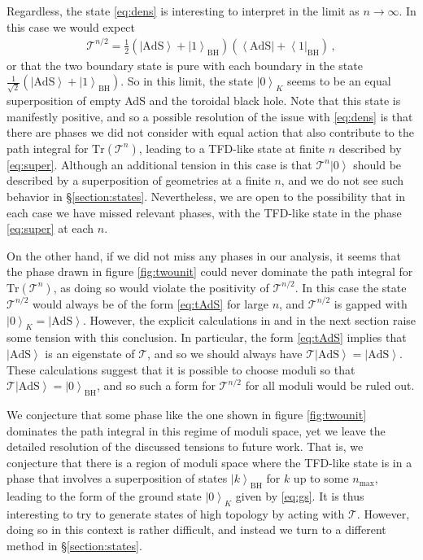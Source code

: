 \documentclass[letterpaper,12pt]{article}
\newcommand{\ban}[1]{\begin{align}#1\end{align}}
\newcommand{\Tr}{\text{Tr}}
\newcommand{\ket}[1]{\left| #1\right>}
\newcommand{\bra}[1]{\left< #1\right|}
\begin{document}
Regardless, the state \eqref{eq:dens} is interesting to interpret in the limit as $n \to \infty$. In this case we would expect
\ban{
\mathcal T^{n/2} = \frac 12 \left( \ket{\text{AdS}} +\ket 1_\text{BH}\right)\left( \bra{\text{AdS}} +\bra 1_\text{BH}\right) \label{eq:super}\, ,
}
or that the two boundary state is pure with each boundary in the state $\frac 1{\sqrt 2} \left( \ket{\text{AdS}} +\ket 1_\text{BH}\right)$. So in this limit, the state $\ket 0_K$ seems to be an equal superposition of empty AdS and the toroidal black hole. Note that this state is manifestly positive, and so a possible resolution of the issue with \eqref{eq:dens} is that there are phases we did not consider with equal action that also contribute to the path integral for $\Tr(\mathcal T^n)$, leading to a TFD-like state at finite $n$ described by \eqref{eq:super}. Although an additional tension in this case is that $\mathcal T^n \ket 0$ should be described by a superposition of geometries at a finite $n$, and we do not see such behavior in \S\ref{section:states}. Nevertheless, we are open to the possibility that in each case we have missed relevant phases, with the TFD-like state in the phase \eqref{eq:super} at each $n$.

On the other hand, if we did not miss any phases in our analysis, it seems that the phase drawn in figure \ref{fig:twounit} could never dominate the path integral for $\Tr(\mathcal T^n)$, as doing so would violate the positivity of $\mathcal T^{n/2}$. In this case the state $\mathcal T^{n/2}$ would always be of the form \eqref{eq:tAdS} for large $n$, and $\mathcal T^{n/2}$ is gapped with $\ket 0_K = \ket{\text{AdS}}$. However, the explicit calculations in \cite{MRW} and in the next section raise some tension with this conclusion. In particular, the form \eqref{eq:tAdS} implies that $\ket{\text{AdS}}$ is an eigenstate of $\mathcal T$, and so we should always have $\mathcal T \ket{\text{AdS}} = \ket{\text{AdS}}$. These calculations suggest that it is possible to choose moduli so that $\mathcal T \ket{\text{AdS}} = \ket{0}_\text{BH}$, and so such a form for $\mathcal T^{n/2}$ for all moduli would be ruled out.

We conjecture that some phase like the one shown in figure \ref{fig:twounit} dominates the path integral in this regime of moduli space, yet we leave the detailed resolution of the discussed tensions to future work. That is, we conjecture that there is a region of moduli space where the TFD-like state is in a phase that involves a superposition of states $\ket k_\text{BH}$ for $k$ up to some $n_\text{max}$, leading to the form of the ground state $\ket 0_K$ given by \eqref{eq:gs}.  It is thus interesting to try to generate states of high topology by acting with $\mathcal T$. However, doing so in this context is rather difficult, and instead we turn to a different method in \S\ref{section:states}.
\end{document}
